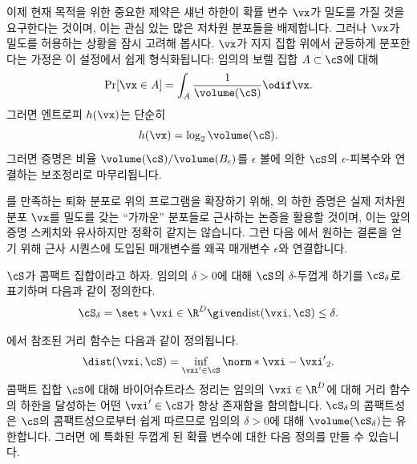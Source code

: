 \documentclass[../../book-main_ko.tex]{subfiles}
\begin{document}
이제 현재 목적을 위한 중요한 제약은 섀넌 하한이 확률 변수 \(\vx\)가 밀도를 가질 것을 요구한다는 것이며, 이는 관심 있는 많은 저차원 분포들을 배제합니다.
그러나 \(\vx\)가 밀도를 허용하는 상황을 잠시 고려해 봅시다.
\(\vx\)가 지지 집합 위에서 균등하게 분포한다는 가정은 이 설정에서 쉽게 형식화됩니다: 임의의 보렐 집합 \(A \subset \cS\)에 대해
\begin{equation}
    \Pr[\vx \in A] = \int_{A} \frac{1}{\volume(\cS)} \odif \vx.
\end{equation}
그러면 엔트로피 \(h(\vx)\)는 단순히
\begin{equation}
    h(\vx) = \log_2 \volume(\cS).
\end{equation}
그러면 증명은 비율 \(\volume(\cS) / \volume(B_{\epsilon})\)를 \(\epsilon\) 볼에 의한 \(\cS\)의 \(\epsilon\)-피복수와 연결하는 보조정리로 마무리됩니다.


를 만족하는 퇴화 분포로 위의 프로그램을 확장하기 위해,
의 하한 증명은 실제 저차원 분포 \(\vx\)를 밀도를 갖는 ``가까운'' 분포들로 근사하는 논증을 활용할 것이며, 이는  앞의 증명 스케치와 유사하지만 정확히 같지는 않습니다.
그런 다음 에서 원하는 결론을 얻기 위해 근사 시퀀스에 도입된 매개변수를 왜곡 매개변수 \(\epsilon\)와 연결합니다.


\begin{definition}\label{def:thickening-set}
    \(\cS\)가 콤팩트 집합이라고 하자.
    임의의 \(\delta > 0\)에 대해 \(\cS\)의 \(\delta\)-두껍게 하기를 \(\cS_{\delta}\)로 표기하며 다음과 같이 정의한다.
    \begin{equation}
        \cS_{\delta} = \set*{\vxi \in \R^D \given \mathrm{dist}(\vxi, \cS) \leq
        \delta}.
    \end{equation}
\end{definition}
에서 참조된 거리 함수는 다음과 같이 정의됩니다.
\begin{equation}\label{eq:dist-func}
    \dist(\vxi, \cS) = \inf_{\vxi' \in \cS} \norm*{\vxi - \vxi'}_2.
\end{equation}
콤팩트 집합 \(\cS\)에 대해 바이어슈트라스 정리는 임의의 \(\vxi \in \R^D\)에 대해 거리 함수의 하한을 달성하는 어떤 \(\vxi' \in \cS\)가 항상 존재함을 함의합니다.
\(\cS_{\delta}\)의 콤팩트성은 \(\cS\)의 콤팩트성으로부터 쉽게 따르므로 임의의 \(\delta > 0\)에 대해 \(\volume(\cS_{\delta})\)는 유한합니다. 그러면 에 특화된 두껍게 된 확률 변수에 대한 다음 정의를 만들 수 있습니다.
\end{document}
